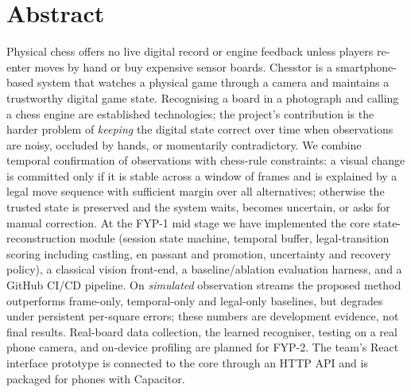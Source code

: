 \chapter*{Abstract}
Physical chess offers no live digital record or engine feedback unless players re-enter moves by hand or buy
expensive sensor boards. Chesstor is a smartphone-based system that watches a physical game through a camera and
maintains a trustworthy digital game state. Recognising a board in a photograph and calling a chess engine are
established technologies; the project's contribution is the harder problem of \emph{keeping} the digital state
correct over time when observations are noisy, occluded by hands, or momentarily contradictory. We combine
temporal confirmation of observations with chess-rule constraints: a visual change is committed only if it is
stable across a window of frames and is explained by a legal move sequence with sufficient margin over all
alternatives; otherwise the trusted state is preserved and the system waits, becomes uncertain, or asks for
manual correction. At the FYP-1 mid stage we have implemented the core state-reconstruction module (session state
machine, temporal buffer, legal-transition scoring including castling, en passant and promotion, uncertainty and
recovery policy), a classical vision front-end, a baseline/ablation evaluation harness, and a GitHub CI/CD
pipeline. On \emph{simulated} observation streams the proposed method outperforms frame-only, temporal-only and
legal-only baselines, but degrades under persistent per-square errors; these numbers are development evidence, not
final results. Real-board data collection, the learned recogniser, testing on a real phone camera, and
on-device profiling are planned for FYP-2. The team's React interface prototype is connected to the core through an
HTTP API and is packaged for phones with Capacitor.
